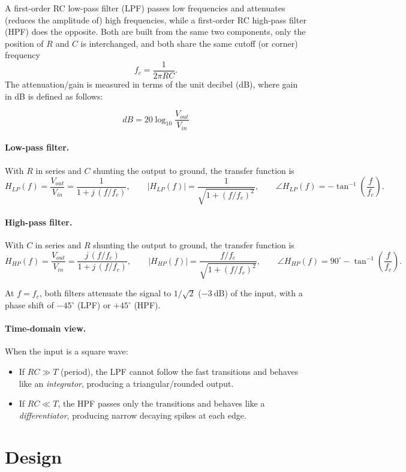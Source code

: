 A first-order RC low-pass filter (LPF) passes low frequencies and attenuates (reduces the amplitude of)
high frequencies, while a first-order RC high-pass filter (HPF) does the
opposite. Both are built from the same two components, only the position of
$R$ and $C$ is interchanged, and both share the same cutoff (or corner)
frequency
\[
f_c = \frac{1}{2\pi R C}.
\]
The attenuation/gain is measured in terms of the unit decibel (dB), where gain in dB is defined as follows:

\[
dB = 20\log_{10}\frac{V_{out}}{V_{in}}
\]
\paragraph{Low-pass filter.} With $R$ in series and $C$ shunting the output
to ground, the transfer function is
\[
H_{LP}(f) = \frac{V_{out}}{V_{in}} = \frac{1}{1 + j\,(f/f_c)}, \qquad
|H_{LP}(f)| = \frac{1}{\sqrt{1+(f/f_c)^2}}, \qquad
\angle H_{LP}(f) = -\tan^{-1}\!\left(\frac{f}{f_c}\right).
\]

\paragraph{High-pass filter.} With $C$ in series and $R$ shunting the output
to ground, the transfer function is
\[
H_{HP}(f) = \frac{V_{out}}{V_{in}} = \frac{j\,(f/f_c)}{1 + j\,(f/f_c)}, \qquad
|H_{HP}(f)| = \frac{f/f_c}{\sqrt{1+(f/f_c)^2}}, \qquad
\angle H_{HP}(f) = 90^\circ - \tan^{-1}\!\left(\frac{f}{f_c}\right).
\]

At $f = f_c$, both filters attenuate the signal to $1/\sqrt{2}$ ($-3\ \text{dB}$)
of the input, with a phase shift of $-45^\circ$ (LPF) or $+45^\circ$ (HPF).

\paragraph{Time-domain view.} When the input is a square wave:
\begin{itemize}
	\item If $RC \gg T$ (period), the LPF cannot follow the fast transitions and
	behaves like an \emph{integrator}, producing a triangular/rounded output.
	\item If $RC \ll T$, the HPF passes only the transitions and behaves like a
	\emph{differentiator}, producing narrow decaying spikes at each edge.
\end{itemize}

\section{Design}

